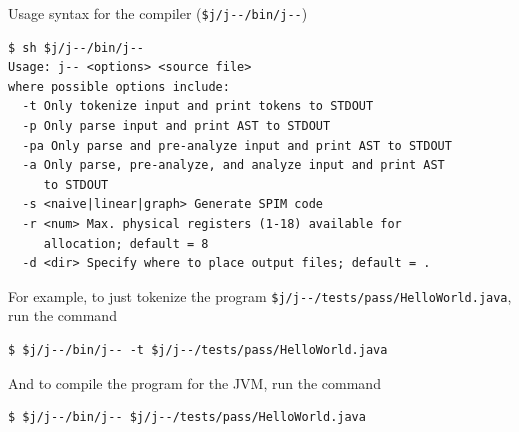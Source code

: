 \documentclass[8pt,a4paper,compress]{beamer}
\begin{document}
\begin{frame}[fragile]
\pause

Usage syntax for the \jmm compiler (\lstinline{$j/j--/bin/j--})

\begin{tcolorbox}[enhanced,drop shadow southwest,sharp corners,size=fbox,colback=black]
\begin{lstlisting}[style=terminal]
$ sh $j/j--/bin/j--
Usage: j-- <options> <source file>
where possible options include:
  -t Only tokenize input and print tokens to STDOUT
  -p Only parse input and print AST to STDOUT
  -pa Only parse and pre-analyze input and print AST to STDOUT
  -a Only parse, pre-analyze, and analyze input and print AST 
     to STDOUT
  -s <naive|linear|graph> Generate SPIM code
  -r <num> Max. physical registers (1-18) available for 
     allocation; default = 8
  -d <dir> Specify where to place output files; default = .
\end{lstlisting}
\end{tcolorbox}

\pause\bigskip

For example, to just tokenize the \jmm program \lstinline{$j/j--/tests/pass/HelloWorld.java}, run the command

\begin{tcolorbox}[enhanced,drop shadow southwest,sharp corners,size=fbox,colback=black]
\begin{lstlisting}[style=terminal]
$ $j/j--/bin/j-- -t $j/j--/tests/pass/HelloWorld.java
\end{lstlisting}
\end{tcolorbox}

\pause\bigskip

And to compile the program for the JVM, run the command

\begin{tcolorbox}[enhanced,drop shadow southwest,sharp corners,size=fbox,colback=black]
\begin{lstlisting}[style=terminal]
$ $j/j--/bin/j-- $j/j--/tests/pass/HelloWorld.java
\end{lstlisting}
\end{tcolorbox}
\end{frame}
\end{document}
